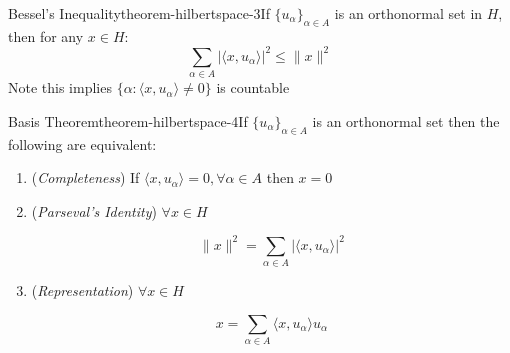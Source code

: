\begin{mystthmtheorem}{Bessel's Inequality}{theorem-hilbertspace-3}If $\{u_{\alpha}\}_{\alpha \in A}$ is an orthonormal set in $H$, then for any $x\in H$:
\begin{equation}
\sum_{\alpha \in A}|\langle x, u_{\alpha}\rangle|^2 \leq \|x\|^2
\end{equation}
Note this implies $\{\alpha: \langle x,u_{\alpha} \rangle\neq 0\}$ is countable

\end{mystthmtheorem}
\begin{mystthmtheorem}{Basis Theorem}{theorem-hilbertspace-4}If $\{u_{\alpha}\}_{\alpha \in A}$ is an orthonormal set then the following are equivalent:

\begin{enumerate}
\item (\textit{Completeness}) If $\langle x,u_{\alpha}\rangle =0, \forall \alpha \in A$ then $x=0$
\item (\textit{Parseval's Identity}) $\forall x\in H$

\begin{equation}
\|x\|^2 = \sum_{\alpha \in A} |\langle x, u_{\alpha} \rangle|^2
\end{equation}


\item (\textit{Representation}) $\forall x\in H$

\begin{equation}
x = \sum_{\alpha \in A} \langle x, u_{\alpha} \rangle u_{\alpha}
\end{equation}
\end{enumerate}

\end{mystthmtheorem}

